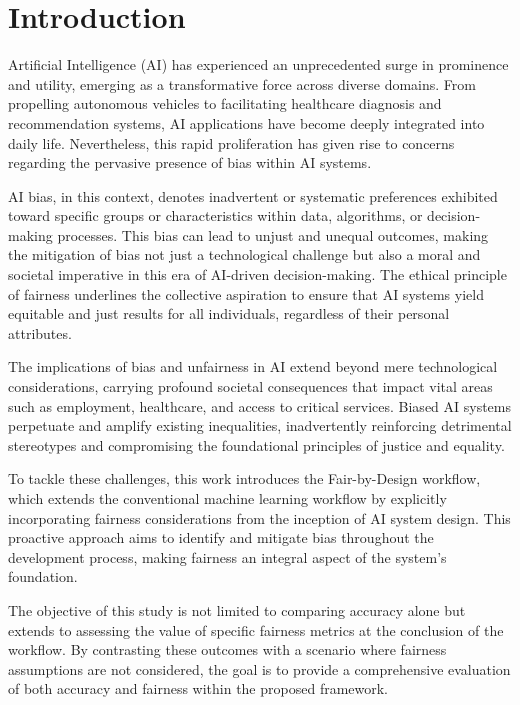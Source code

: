 \chapter{Introduction}
\label{chap:introduction}

Artificial Intelligence (AI) has experienced an unprecedented surge in prominence and utility, emerging as a transformative force across diverse domains. From propelling autonomous vehicles to facilitating healthcare diagnosis and recommendation systems, AI applications have become deeply integrated into daily life. Nevertheless, this rapid proliferation has given rise to concerns regarding the pervasive presence of bias within AI systems.

AI bias, in this context, denotes inadvertent or systematic preferences exhibited toward specific groups or characteristics within data, algorithms, or decision-making processes. This bias can lead to unjust and unequal outcomes, making the mitigation of bias not just a technological challenge but also a moral and societal imperative in this era of AI-driven decision-making. The ethical principle of fairness underlines the collective aspiration to ensure that AI systems yield equitable and just results for all individuals, regardless of their personal attributes.

The implications of bias and unfairness in AI extend beyond mere technological considerations, carrying profound societal consequences that impact vital areas such as employment, healthcare, and access to critical services. Biased AI systems perpetuate and amplify existing inequalities, inadvertently reinforcing detrimental stereotypes and compromising the foundational principles of justice and equality.

To tackle these challenges, this work introduces the Fair-by-Design workflow, which extends the conventional machine learning workflow by explicitly incorporating fairness considerations from the inception of AI system design. This proactive approach aims to identify and mitigate bias throughout the development process, making fairness an integral aspect of the system's foundation.

The objective of this study is not limited to comparing accuracy alone but extends to assessing the value of specific fairness metrics at the conclusion of the workflow. By contrasting these outcomes with a scenario where fairness assumptions are not considered, the goal is to provide a comprehensive evaluation of both accuracy and fairness within the proposed framework.

